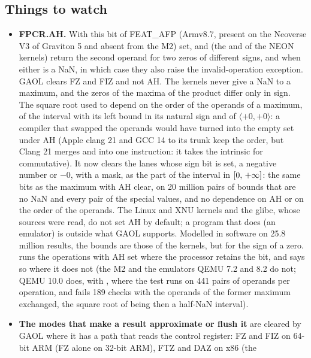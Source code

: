 \documentclass[12pt,a4paper,twoside,openright]{book}
\begin{document}
\subsection{Things to watch}

\begin{itemize}
\item[$\bullet$] \textbf{FPCR.AH.} With this bit of FEAT\_AFP (Armv8.7,
present on the Neoverse V3 of Graviton 5 and absent from the M2) set,
 and  (the  and 
of the NEON kernels) return the second operand for two zeros of different
signs, and when either is a NaN, in which case they also raise the
invalid-operation exception. GAOL clears FZ and FIZ and not AH. The kernels
never give a NaN to a maximum, and the zeros of the maxima of the product
differ only in sign. The square root used to depend on the order of the
operands of a maximum, of the interval with its left bound in its natural
sign and of $\langle +0, +0 \rangle$: a compiler that swapped the operands
would have turned  into the empty set under AH (Apple
clang 21 and GCC 14 to its trunk keep the order, but Clang 21 merges
 and  into one instruction:
it takes the intrinsic for commutative). It now clears the lanes whose sign
bit is set, a negative number or $-0$, with a mask, as the part of the
interval in $[0,\,+\infty]$:\newinvfive{} the same bits as the maximum
with AH clear, on 20 million pairs of bounds that are no NaN and every pair
of the special values, and no dependence on AH or on the order of the
operands. The Linux and XNU kernels and the glibc, whose sources were read,
do not set AH by default; a program that does (an emulator) is outside what
GAOL supports. Modelled in software on 25.8 million results, the bounds are
those of the kernels, but for the sign of a zero.
 runs the operations with AH set where
the processor retains the bit, and says so where it does not (the M2 and the
emulators QEMU 7.2 and 8.2 do not; QEMU 10.0 does, with
, where the test runs on 441 pairs of operands
per operation, and fails 189 checks with the operands of the former maximum
exchanged, the square root of \code{[-0, r]} being then a half-NaN
interval).
\item[$\bullet$] \textbf{The modes that make a result approximate or flush
it} are cleared by GAOL where it has a path that reads the control register:
FZ and FIZ on 64-bit ARM (FZ alone on 32-bit ARM), FTZ and DAZ on x86 (the

\end{itemize}
\end{document}

